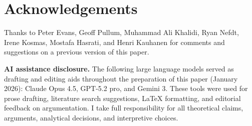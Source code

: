 \documentclass[12pt,letterpaper]{article}
\begin{document}
\section*{Acknowledgements}

Thanks to Peter Evans, Geoff Pullum, Muhammad Ali Khalidi, Ryan Nefdt, Irene Kosmas, Mostafa Hasrati, and Henri Kauhanen for comments and suggestions on a previous version of this paper.

\medskip
\noindent\textbf{AI assistance disclosure.} The following large language models served as drafting and editing aids throughout the preparation of this paper (January 2026): Claude Opus 4.5, GPT-5.2 pro, and Gemini 3. These tools were used for prose drafting, literature search suggestions, LaTeX formatting, and editorial feedback on argumentation. I take full responsibility for all theoretical claims, arguments, analytical decisions, and interpretive choices.

\newpage
\begin{sloppypar}
\printbibliography[title=References]
\end{sloppypar}
\end{document}
